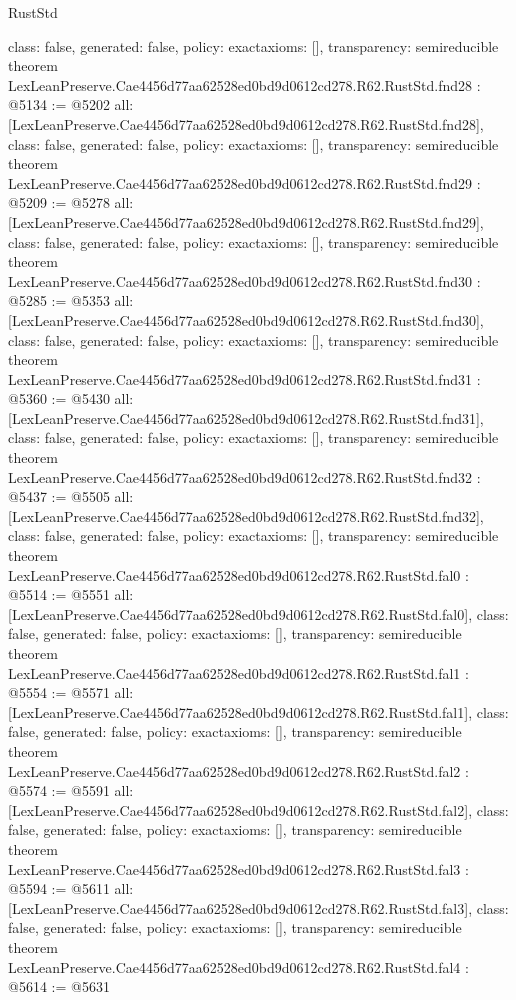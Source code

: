\begin{lexlean}{RustStd}
\begin{coremodule}
{  class: false,
  generated: false,
  policy: exact{axioms: []},
  transparency: semireducible
}
theorem LexLeanPreserve.Cae4456d77aa62528ed0bd9d0612cd278.R62.RustStd.fnd28 : @5134 := @5202 {
  all: [LexLeanPreserve.Cae4456d77aa62528ed0bd9d0612cd278.R62.RustStd.fnd28],
  class: false,
  generated: false,
  policy: exact{axioms: []},
  transparency: semireducible
}
theorem LexLeanPreserve.Cae4456d77aa62528ed0bd9d0612cd278.R62.RustStd.fnd29 : @5209 := @5278 {
  all: [LexLeanPreserve.Cae4456d77aa62528ed0bd9d0612cd278.R62.RustStd.fnd29],
  class: false,
  generated: false,
  policy: exact{axioms: []},
  transparency: semireducible
}
theorem LexLeanPreserve.Cae4456d77aa62528ed0bd9d0612cd278.R62.RustStd.fnd30 : @5285 := @5353 {
  all: [LexLeanPreserve.Cae4456d77aa62528ed0bd9d0612cd278.R62.RustStd.fnd30],
  class: false,
  generated: false,
  policy: exact{axioms: []},
  transparency: semireducible
}
theorem LexLeanPreserve.Cae4456d77aa62528ed0bd9d0612cd278.R62.RustStd.fnd31 : @5360 := @5430 {
  all: [LexLeanPreserve.Cae4456d77aa62528ed0bd9d0612cd278.R62.RustStd.fnd31],
  class: false,
  generated: false,
  policy: exact{axioms: []},
  transparency: semireducible
}
theorem LexLeanPreserve.Cae4456d77aa62528ed0bd9d0612cd278.R62.RustStd.fnd32 : @5437 := @5505 {
  all: [LexLeanPreserve.Cae4456d77aa62528ed0bd9d0612cd278.R62.RustStd.fnd32],
  class: false,
  generated: false,
  policy: exact{axioms: []},
  transparency: semireducible
}
theorem LexLeanPreserve.Cae4456d77aa62528ed0bd9d0612cd278.R62.RustStd.fal0 : @5514 := @5551 {
  all: [LexLeanPreserve.Cae4456d77aa62528ed0bd9d0612cd278.R62.RustStd.fal0],
  class: false,
  generated: false,
  policy: exact{axioms: []},
  transparency: semireducible
}
theorem LexLeanPreserve.Cae4456d77aa62528ed0bd9d0612cd278.R62.RustStd.fal1 : @5554 := @5571 {
  all: [LexLeanPreserve.Cae4456d77aa62528ed0bd9d0612cd278.R62.RustStd.fal1],
  class: false,
  generated: false,
  policy: exact{axioms: []},
  transparency: semireducible
}
theorem LexLeanPreserve.Cae4456d77aa62528ed0bd9d0612cd278.R62.RustStd.fal2 : @5574 := @5591 {
  all: [LexLeanPreserve.Cae4456d77aa62528ed0bd9d0612cd278.R62.RustStd.fal2],
  class: false,
  generated: false,
  policy: exact{axioms: []},
  transparency: semireducible
}
theorem LexLeanPreserve.Cae4456d77aa62528ed0bd9d0612cd278.R62.RustStd.fal3 : @5594 := @5611 {
  all: [LexLeanPreserve.Cae4456d77aa62528ed0bd9d0612cd278.R62.RustStd.fal3],
  class: false,
  generated: false,
  policy: exact{axioms: []},
  transparency: semireducible
}
theorem LexLeanPreserve.Cae4456d77aa62528ed0bd9d0612cd278.R62.RustStd.fal4 : @5614 := @5631 {
}
\end{coremodule}
\end{lexlean}
